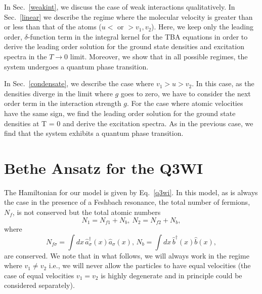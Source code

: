 \documentclass[aps,pra,
superscriptaddress,
reprint,twocolumn,preprintnumbers,
amsmath,amssymb,
nofootinbib]{revtex4-1}
\begin{document}
In Sec.~\ref{weakint}, we discuss the case of weak interactions qualitatively. In Sec.~\ref{linear} we describe the regime where the molecular velocity is greater than or less than that of the atoms ($u <$ or $> v_1, v_2$). Here, we keep only the leading order, $\delta$-function term in the integral kernel for the TBA equations in order to derive the leading order solution for the ground state densities and excitation spectra in the $T\to0$ limit. Moreover, we show that in all possible regimes, the system undergoes a quantum phase transition.

In Sec.~\ref{condensate}, we describe the case where $v_1>u>v_2$. In this case, as the densities diverge in the limit where $g$ goes to zero, we have to consider the next order term in the interaction strength $g$. For the case where atomic velocities have the same sign, we find the leading order solution for the ground state densities at T = 0 and derive the excitation spectra. As in the previous case, we find that the system exhibits a quantum phase transition. 

	
	\section{Bethe Ansatz for the Q3WI}
	\label{bethe}
	
The Hamiltonian for our model is given by Eq.~\eqref{q3wi}. 
In this model, as is always the case in the presence of a Feshbach resonance, the total number of fermions, $N_f$, is not conserved but the total atomic numbers
\begin{equation}
\label{eq:n1n2}
N_1 = N_{f1} + N_b, \ N_2 = N_{f2}+N_b,
\end{equation} where
		\begin{equation}
		N_{f\sigma}= \int dx \, \hat a_{\sigma}^\dagger(x) \hat a_{\sigma}(x), \,  N_b=   \int dx \, \hat b^\dagger(x) \hat b(x),
		\end{equation}
are conserved. We note that in what follows, we will always work in the regime where $v_1 \neq v_2$ i.e., we will never allow the particles to have equal velocities (the case of equal velocities $v_1=v_2$ is highly degenerate and in principle could be considered separately). 
\end{document}
